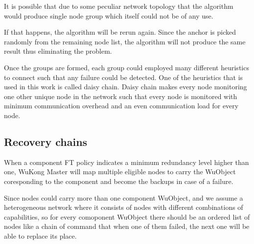 It is possible that due to some peculiar network topology that the
algorithm would produce single node group which itself could not be of any use.

If that happens, the algorithm will be rerun again. Since the anchor is picked
randomly from the remaining node list, the algorithm will not produce the same
result thus eliminating the problem.

Once the groups are formed, each group could employed many different heuristics
to connect such that any failure could be detected. One of the heuristics that
is used in this work is called daisy chain. Daisy chain makes every node
monitoring one other unique node in the network such that every node is
monitored with minimum communication overhead and an even communication load
for every node.

\subsection{Recovery chains}

When a component FT policy indicates a minimum redundancy level higher than
one, WuKong Master will map multiple eligible nodes to carry the WuObject
coresponding to the component and become the backups in case of a failure.

Since nodes could carry more than one component WuObject, and we assume
a heterogeneous network where it consists of nodes with different combinations
of capabilities, so for every comoponent WuObject there should be an ordered
list of nodes like a chain of command that when one of them failed, the next
one will be able to replace its place.

